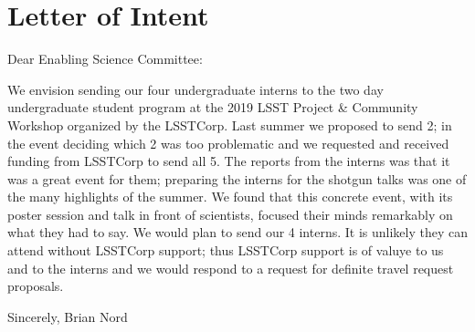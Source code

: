 \section{Letter of Intent}

Dear Enabling Science Committee:

We envision sending our four undergraduate interns to the two day
undergraduate student program at the 2019 LSST Project \& Community Workshop
organized by the LSSTCorp. Last summer we proposed to send 2; in the event
deciding which 2 was too problematic and we requested and received funding from
LSSTCorp to send all 5. The reports from the interns was that it was a great event
for them; preparing the interns for the shotgun talks was one of the many
highlights of the summer. We found that this concrete event, with its poster session
and talk in front of scientists, focused their minds remarkably on what they had to
say. We would plan to send our 4 interns. It is unlikely they
can attend without LSSTCorp support; thus LSSTCorp support is of valuye to us and to the
interns and we would respond to a request for
definite travel request proposals.

Sincerely,
Brian Nord
